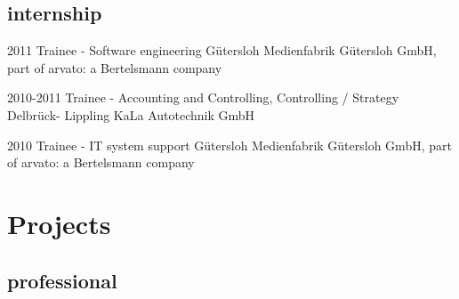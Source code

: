 \documentclass[]{friggeri-cv} %
\begin{document}
\subsection{internship}

\begin{entrylist}
	
	
	\entry
	{2011}
	{Trainee - Software engineering}
	{G\"{u}tersloh}
	{Medienfabrik G\"{u}tersloh GmbH, part of arvato: a Bertelsmann company}
	
	
	\entry
	{2010-2011}
	{Trainee - Accounting and Controlling, Controlling / Strategy}
	{Delbr\"{u}ck- Lippling}
	{KaLa Autotechnik GmbH}
	
	
	\entry
	{2010}
	{Trainee - IT system support}
	{G\"{u}tersloh}
	{Medienfabrik G\"{u}tersloh GmbH, part of arvato: a Bertelsmann company}


\end{entrylist}

\pagebreak


\section{Projects}

\subsection{professional}
\end{document}
